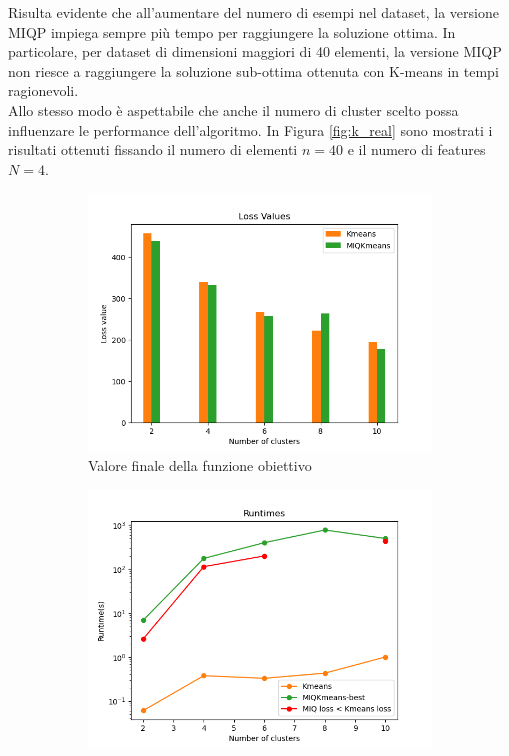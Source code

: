 \documentclass{article}
\begin{document}
    Risulta evidente che all'aumentare del numero di esempi nel dataset, la versione MIQP impiega sempre più tempo per raggiungere la soluzione ottima. In particolare, per dataset di dimensioni maggiori di 40 elementi, la versione MIQP non riesce a raggiungere la soluzione sub-ottima ottenuta con K-means in tempi ragionevoli.\\
    Allo stesso modo è aspettabile che anche il numero di cluster scelto possa influenzare le performance dell'algoritmo. In Figura \ref{fig:k_real} sono mostrati i risultati ottenuti fissando il numero di elementi $n=40$ e il numero di features $N=4$.
    \begin{figure}[H]
     \centering
     \begin{subfigure}[t]{0.485\linewidth}
         \centering
         \includegraphics[width=\linewidth]{../results/log_plots/loss_centers_heart}
         \caption{Valore finale della funzione obiettivo}
     \end{subfigure}
     \hfill
     \begin{subfigure}[t]{0.49\linewidth}
         \centering
         \includegraphics[width=\linewidth]{../results/log_plots/runtime_centers_heart_log}

\end{subfigure}
\end{figure}
\end{document}
